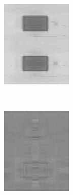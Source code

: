 \documentclass[journal,onecolumn]{IEEEtran}
\begin{document}
{\begin{figure}[H]
\begin{subfigure}[b]{0.2\textwidth}
            \caption{}
            \label{fig:test-crisp-opp-2-ld}
    \end{subfigure}%
    \begin{subfigure}[b]{0.2\textwidth}
            \centering
            \includegraphics[width=.85\linewidth, frame]{test-crisp-opp-3-ld}
            \caption{}
            \label{fig:test-crisp-opp-3-ld}
    \end{subfigure}\\
    \begin{subfigure}[b]{0.2\textwidth}
            \centering
            \includegraphics[width=.85\linewidth, frame]{test-crisp-opp-1-rg}

\end{subfigure}
\end{figure}}
\end{document}
